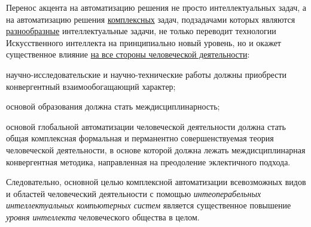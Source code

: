 Перенос акцента на автоматизацию решения не просто интеллектуальных задач, а на автоматизацию решения \uline{комплексных} задач, подзадачами которых являются \uline{разнообразные} интеллектуальные задачи, не только переводит технологии Искусственного интеллекта на принципиально новый уровень, но и окажет существенное влияние \uline{на все стороны человеческой деятельности}:
\begin{textitemize}
	\item  научно-исследовательские и научно-технические работы должны приобрести конвергентный взаимообогащающий характер;
	\item основой образования должна стать междисциплинарность;
	\item основой глобальной автоматизации человеческой деятельности должна стать общая комплексная формальная и перманентно совершенствуемая теория человеческой деятельности, в основе которой должна лежать междисциплинарная конвергентная методика, направленная на преодоление эклектичного подхода.
\end{textitemize}

Следовательно, основной целью комплексной автоматизации всевозможных видов и областей человеческий деятельности с помощью \textit{интеоперабельных интеллектуальных компьютерных систем} является существенное повышение \textit{уровня интеллекта}  человеческого общества в целом.

